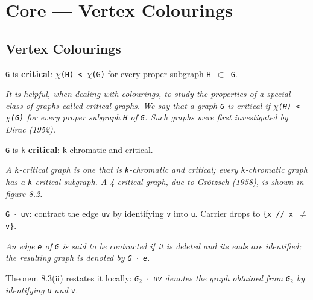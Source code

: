 \section{Core --- Vertex Colourings}
\subsection{Vertex Colourings}


\begin{definition}
\label{SimpleGraph.IsCritical}
\leanok
\texttt{G} is \textbf{critical}: \texttt{$\chi$(H) < $\chi$(G)} for every proper subgraph \texttt{H $\subset$ G}.

\emph{It is helpful, when dealing with
colourings, to study the properties of a special class of graphs called critical
graphs. We say that a graph \texttt{G} is critical if \texttt{$\chi$(H) < $\chi$(G)} for
every proper
subgraph \texttt{H} of \texttt{G}. Such graphs were first investigated by Dirac (1952).}
\end{definition}

\begin{definition}
\label{SimpleGraph.IsKCritical}
\leanok
{}
\texttt{G} is \texttt{k}-\textbf{critical}: \texttt{k}-chromatic and critical.

\emph{A \texttt{k}-critical graph is one that is
\texttt{k}-chromatic and critical; every \texttt{k}-chromatic graph has a \texttt{k}-critical
subgraph.  A 4-critical graph, due to Gr\"otzsch (1958), is shown in figure 8.2.}
\end{definition}

\begin{definition}
\label{SimpleGraph.contractEdge}
\leanok
\texttt{G $\cdot$ uv}: contract the edge \texttt{uv} by identifying \texttt{v} into \texttt{u}. Carrier drops to \texttt{\{x // x $\ne$ v\}}.

\emph{An edge \texttt{e} of
\texttt{G} is said to be contracted if it is deleted and its ends are identified; the
resulting graph is denoted by \texttt{G $\cdot$ e}.}

Theorem 8.3(ii) restates it locally: \emph{\texttt{G$_{2}$ $\cdot$ uv} denotes the graph
obtained from
\texttt{G$_{2}$} by identifying \texttt{u} and \texttt{v}.}
\end{definition}

